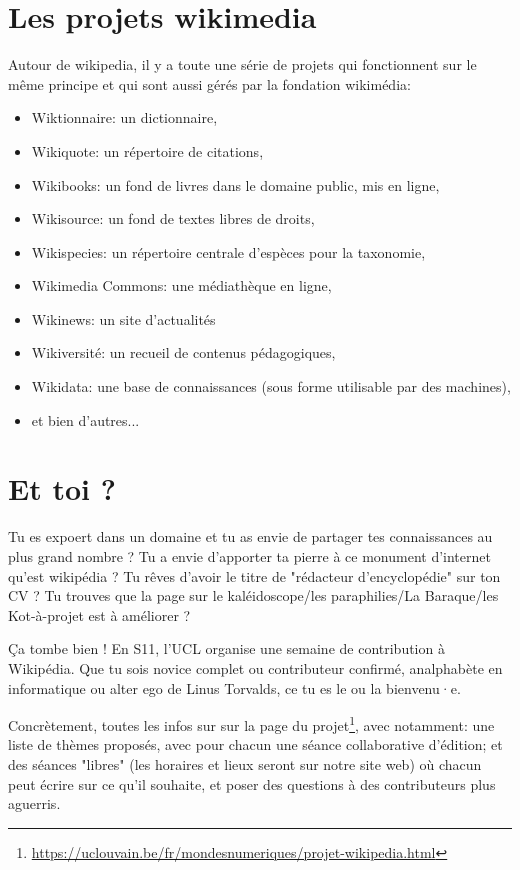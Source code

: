 \documentclass[12pt]{../fiche}
\begin{document}
\section*{Les projets wikimedia}
Autour de wikipedia, il y a toute une série de projets qui fonctionnent sur le même principe et qui sont aussi gérés par la fondation wikimédia:
\begin{itemize}
    \item Wiktionnaire: un dictionnaire,
    \item Wikiquote: un répertoire de citations,
    \item Wikibooks: un fond de livres dans le domaine public, mis en ligne,
    \item Wikisource: un fond de textes libres de droits,
    \item Wikispecies: un répertoire centrale d'espèces pour la taxonomie,
    \item Wikimedia Commons: une médiathèque en ligne,
    \item Wikinews: un site d'actualités
    \item Wikiversité: un recueil de contenus pédagogiques,
    \item Wikidata: une base de connaissances (sous forme utilisable par des machines),
    \item et bien d'autres...
\end{itemize}

\vspace{-0.3cm}
\section*{Et toi ?}

Tu es expoert dans un domaine et tu as envie de partager tes connaissances au plus grand nombre ?
Tu a envie d'apporter ta pierre à ce monument d'internet qu'est wikipédia ?
Tu rêves d'avoir le titre de "rédacteur d'encyclopédie" sur ton CV ?
Tu trouves que la page sur le kaléidoscope/les paraphilies/La Baraque/les Kot-à-projet est à améliorer ?

Ça tombe bien ! En S11, l'UCL organise une semaine de contribution à Wikipédia.
Que tu sois novice complet ou contributeur confirmé, analphabète en informatique ou alter ego de Linus Torvalds,
ce tu es le ou la bienvenu·e.

Concrètement, toutes les infos sur sur la page du projet\footnote{
    \url{https://uclouvain.be/fr/mondesnumeriques/projet-wikipedia.html}
},
avec notamment:
une liste de thèmes proposés, avec pour chacun une séance collaborative
d'édition; et des séances "libres" (les horaires et lieux seront sur notre site web)
où chacun peut écrire sur ce qu'il souhaite,
et poser des questions à des contributeurs plus aguerris.
\end{document}
